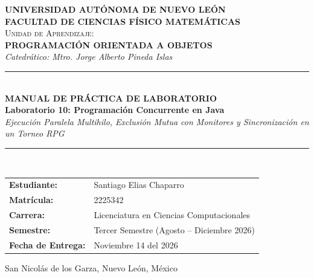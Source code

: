 \documentclass[11pt,letterpaper]{article}
\begin{document}
\begin{titlepage}
    \centering
    \vspace*{0.5cm}
    
    {\Huge \textbf{UNIVERSIDAD AUTÓNOMA DE NUEVO LEÓN}}\\[0.4cm]
    {\LARGE \textbf{FACULTAD DE CIENCIAS FÍSICO MATEMÁTICAS}}\\[2.5cm]
    
    {\large \textsc{Unidad de Aprendizaje:}}\\[0.2cm]
    {\Large \textbf{PROGRAMACIÓN ORIENTADA A OBJETOS}}\\[0.3cm]
    {\large \textit{Catedrático: Mtro. Jorge Alberto Pineda Islas}}\\[2.0cm]
    
    \rule{\linewidth}{0.6mm}\\[0.4cm]
    {\huge \textbf{MANUAL DE PRÁCTICA DE LABORATORIO}}\\[0.3cm]
    {\Large \textbf{Laboratorio 10: Programación Concurrente en Java}}\\[0.2cm]
    {\large \textit{Ejecución Paralela Multihilo, Exclusión Mutua con Monitores y Sincronización en un Torneo RPG}}\\[0.3cm]
    \rule{\linewidth}{0.6mm}\\[2.2cm]
    
    \begin{minipage}{0.85\textwidth}
        \begin{tabular}{ll}
            \textbf{Estudiante:} & Santiago Elias Chaparro \\
            \textbf{Matrícula:} & 2225342 \\
            \textbf{Carrera:} & Licenciatura en Ciencias Computacionales \\
            \textbf{Semestre:} & Tercer Semestre (Agosto -- Diciembre 2026) \\
            \textbf{Fecha de Entrega:} & Noviembre 14 del 2026 \\
        \end{tabular}
    \end{minipage}
    
    \vfill
    {\small San Nicolás de los Garza, Nuevo León, México}
    \vspace*{0.5cm}
\end{titlepage}
\end{document}

